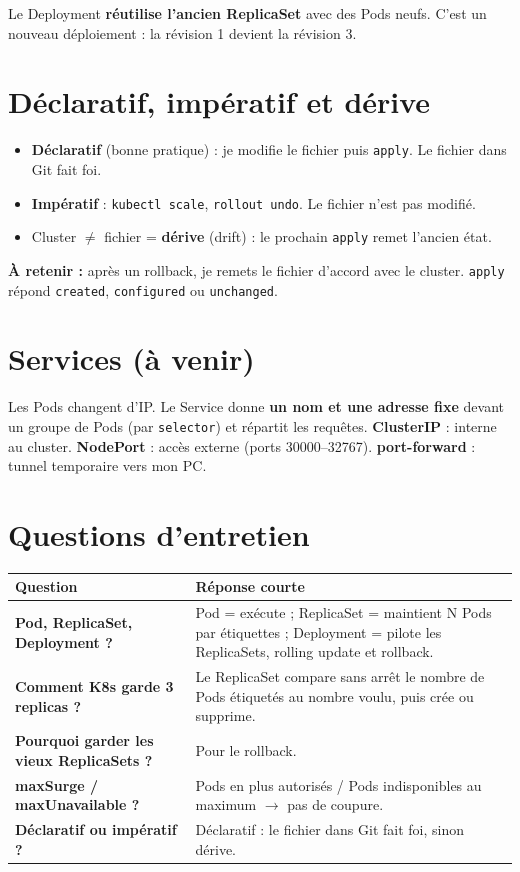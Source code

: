 \documentclass[11pt,a4paper]{article}
\newcommand{\retenir}[1]{\par\smallskip\noindent\colorbox{fond}{\parbox{\dimexpr\linewidth-2\fboxsep}{\textbf{\textcolor{bleu}{À retenir :}} #1}}\par\smallskip}
\begin{document}
Le Deployment \textbf{réutilise l'ancien ReplicaSet} avec des Pods neufs. C'est un nouveau déploiement : la révision 1 devient la révision 3.

\section{Déclaratif, impératif et dérive}

\begin{itemize}
  \item \textbf{Déclaratif} (bonne pratique) : je modifie le fichier puis \texttt{apply}. Le fichier dans Git fait foi.
  \item \textbf{Impératif} : \texttt{kubectl scale}, \texttt{rollout undo}. Le fichier n'est pas modifié.
  \item Cluster $\neq$ fichier = \textbf{dérive} (drift) : le prochain \texttt{apply} remet l'ancien état.
\end{itemize}
\retenir{après un rollback, je remets le fichier d'accord avec le cluster.
\texttt{apply} répond \texttt{created}, \texttt{configured} ou \texttt{unchanged}.}

\section{Services (à venir)}

Les Pods changent d'IP. Le Service donne \textbf{un nom et une adresse fixe} devant un groupe de Pods (par \texttt{selector}) et répartit les requêtes.
\textbf{ClusterIP} : interne au cluster. \textbf{NodePort} : accès externe (ports 30000--32767). \textbf{port-forward} : tunnel temporaire vers mon PC.

\section{Questions d'entretien}

\begin{tabularx}{\linewidth}{@{}>{\bfseries}p{5.2cm}X@{}}
\toprule
Question & Réponse courte \\
\midrule
Pod, ReplicaSet, Deployment ? & Pod = exécute ; ReplicaSet = maintient N Pods par étiquettes ; Deployment = pilote les ReplicaSets, rolling update et rollback. \\
Comment K8s garde 3 replicas ? & Le ReplicaSet compare sans arrêt le nombre de Pods étiquetés au nombre voulu, puis crée ou supprime. \\
Pourquoi garder les vieux ReplicaSets ? & Pour le rollback. \\
maxSurge / maxUnavailable ? & Pods en plus autorisés / Pods indisponibles au maximum $\rightarrow$ pas de coupure. \\
Déclaratif ou impératif ? & Déclaratif : le fichier dans Git fait foi, sinon dérive. \\
\bottomrule
\end{tabularx}
\end{document}
